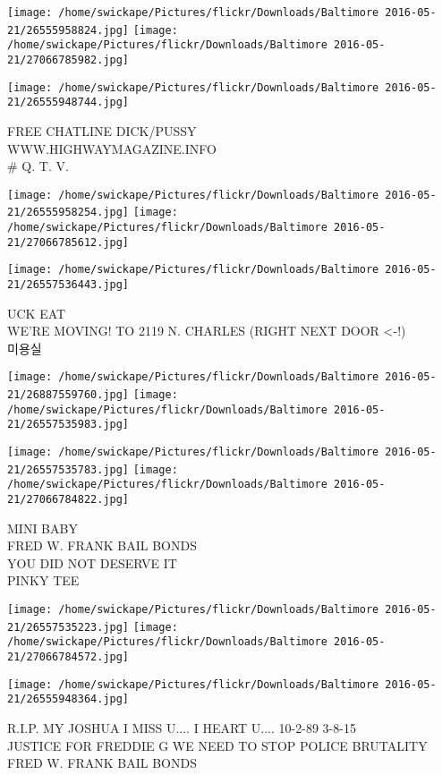 \documentclass[10pt,letterpaper]{article}
\begin{document}
\texttt{[image: /home/swickape/Pictures/flickr/Downloads/Baltimore 2016-05-21/26555958824.jpg]}
\texttt{[image: /home/swickape/Pictures/flickr/Downloads/Baltimore 2016-05-21/27066785982.jpg]}

\vspace{0.25in}
\texttt{[image: /home/swickape/Pictures/flickr/Downloads/Baltimore 2016-05-21/26555948744.jpg]}

FREE CHATLINE DICK/PUSSY\\
WWW.HIGHWAYMAGAZINE.INFO\\
\# Q. T. V.
\pagebreak

\texttt{[image: /home/swickape/Pictures/flickr/Downloads/Baltimore 2016-05-21/26555958254.jpg]}
\texttt{[image: /home/swickape/Pictures/flickr/Downloads/Baltimore 2016-05-21/27066785612.jpg]}

\vspace{0.25in}
\texttt{[image: /home/swickape/Pictures/flickr/Downloads/Baltimore 2016-05-21/26557536443.jpg]}

UCK EAT\\
WE'RE MOVING!  TO 2119 N. CHARLES (RIGHT NEXT DOOR <{-}!)\\
미용실
\pagebreak

\texttt{[image: /home/swickape/Pictures/flickr/Downloads/Baltimore 2016-05-21/26887559760.jpg]}
\texttt{[image: /home/swickape/Pictures/flickr/Downloads/Baltimore 2016-05-21/26557535983.jpg]}

\texttt{[image: /home/swickape/Pictures/flickr/Downloads/Baltimore 2016-05-21/26557535783.jpg]}
\texttt{[image: /home/swickape/Pictures/flickr/Downloads/Baltimore 2016-05-21/27066784822.jpg]}

MINI BABY\\
FRED W. FRANK BAIL BONDS\\
YOU DID NOT DESERVE IT\\
PINKY TEE
\pagebreak

\texttt{[image: /home/swickape/Pictures/flickr/Downloads/Baltimore 2016-05-21/26557535223.jpg]}
\texttt{[image: /home/swickape/Pictures/flickr/Downloads/Baltimore 2016-05-21/27066784572.jpg]}

\vspace{0.25in}
\texttt{[image: /home/swickape/Pictures/flickr/Downloads/Baltimore 2016-05-21/26555948364.jpg]}

R.I.P. MY JOSHUA I MISS U.... I HEART U.... 10{-}2{-}89 3{-}8{-}15\\
JUSTICE FOR FREDDIE G WE NEED TO STOP POLICE BRUTALITY\\
FRED W. FRANK BAIL BONDS
\pagebreak
\end{document}
